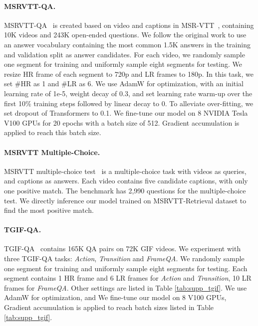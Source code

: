 \paragraph{MSRVTT-QA.} 
MSRVTT-QA~\cite{xu2017video} is created based on video and captions in MSR-VTT~\cite{xu2016msr}, containing 10K videos and 243K open-ended questions. We follow the original work to use an answer vocabulary containing the most common 1.5K answers in the training and validation split as answer candidates. For each video, we randomly sample one segment for training and uniformly sample eight segments for testing. We resize HR frame of each segment to 720p and LR frames to 180p. In this task, we set \#HR as 1 and \#LR as 6.  We use AdamW for optimization, with an initial learning rate of 1e-5, weight decay of 0.3, and set learning rate warm-up over the first 10\% training steps followed by linear decay to 0. To alleviate over-fitting, we set dropout of Transformers to 0.1. We fine-tune our model on 8 NVIDIA Tesla V100 GPUs for 20 epochs with a batch size of 512. Gradient accumulation is applied to reach this batch size.

\paragraph{MSRVTT Multiple-Choice.}
MSRVTT multiple-choice test~\cite{yu2018jsfusion} is a multiple-choice task with videos as queries, and captions as answers. Each video contains five candidate captions, with only one positive match. The benchmark has 2,990 questions for the multiple-choice test. We directly inference our model trained on MSRVTT-Retrieval dataset to find the most positive match.

\paragraph{TGIF-QA.}
TGIF-QA~\cite{jang2017tgif} contains 165K QA pairs on 72K GIF videos. We experiment with three TGIF-QA tasks: \textit{Action}, \textit{Transition} and \textit{FrameQA}. We randomly sample one segment for training and uniformly sample eight segments for testing. Each segment contains 1 HR frame and 6 LR frames for \textit{Action} and \textit{Transition}, 10 LR frames for \textit{FrameQA}. Other settings are listed in Table \ref{tab:supp_tgif}. We use AdamW for optimization, and We fine-tune our model on 8 V100 GPUs, Gradient accumulation is applied to reach batch sizes listed in Table \ref{tab:supp_tgif}.

